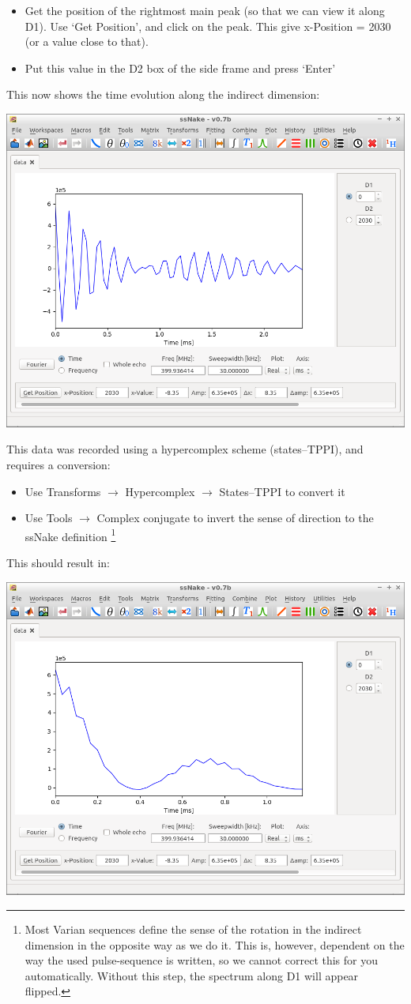 \documentclass[11pt,a4paper]{article}
\begin{document}
\begin{itemize}
  \item Get the position of the rightmost main peak (so that we can view it along D1). Use `Get
	 Position', and click on the peak. This give x-Position = 2030 (or a value close to that).
  \item Put this value in the D2 box of the side frame and press `Enter'
\end{itemize}
This now shows the time evolution along the indirect dimension:
\begin{center}
\includegraphics[width=0.7\linewidth]{Figs/Fig3.png}
\end{center}
This data was recorded using a hypercomplex scheme (states--TPPI), and requires a conversion:

\begin{itemize}
  \item Use Transforms $\longrightarrow$ Hypercomplex $\longrightarrow$ States--TPPI to convert it
	\item Use Tools $\longrightarrow$ Complex conjugate to invert the sense of direction to the
	  ssNake definition \footnote{Most Varian sequences define the sense of the rotation in the
	  indirect dimension in the opposite way as we do it. This is, however, dependent on the way the
	used pulse-sequence is written, so we cannot correct this for you automatically. Without this
 step, the spectrum along D1 will appear flipped. }
\end{itemize}
This should result in:
\begin{center}
\includegraphics[width=0.7\linewidth]{Figs/Fig4.png}
\end{center}
\end{document}
